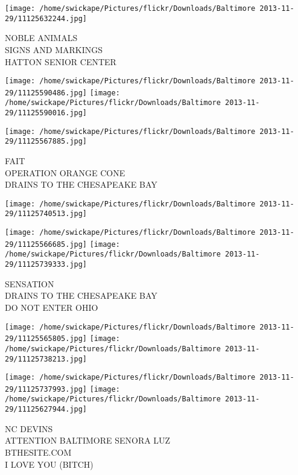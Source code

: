 \documentclass[10pt,letterpaper]{article}
\begin{document}
\vspace{0.25in}
\texttt{[image: /home/swickape/Pictures/flickr/Downloads/Baltimore 2013-11-29/11125632244.jpg]}

NOBLE ANIMALS\\
SIGNS AND MARKINGS\\
HATTON SENIOR CENTER\\
\pagebreak

\texttt{[image: /home/swickape/Pictures/flickr/Downloads/Baltimore 2013-11-29/11125590486.jpg]}
\texttt{[image: /home/swickape/Pictures/flickr/Downloads/Baltimore 2013-11-29/11125590016.jpg]}

\texttt{[image: /home/swickape/Pictures/flickr/Downloads/Baltimore 2013-11-29/11125567885.jpg]}

FAIT\\
OPERATION ORANGE CONE\\
DRAINS TO THE CHESAPEAKE BAY\\
\pagebreak

\texttt{[image: /home/swickape/Pictures/flickr/Downloads/Baltimore 2013-11-29/11125740513.jpg]}

\vspace{0.25in}
\texttt{[image: /home/swickape/Pictures/flickr/Downloads/Baltimore 2013-11-29/11125566685.jpg]}
\texttt{[image: /home/swickape/Pictures/flickr/Downloads/Baltimore 2013-11-29/11125739333.jpg]}

SENSATION\\
DRAINS TO THE CHESAPEAKE BAY\\
DO NOT ENTER OHIO\\
\pagebreak

\texttt{[image: /home/swickape/Pictures/flickr/Downloads/Baltimore 2013-11-29/11125565805.jpg]}
\texttt{[image: /home/swickape/Pictures/flickr/Downloads/Baltimore 2013-11-29/11125738213.jpg]}

\texttt{[image: /home/swickape/Pictures/flickr/Downloads/Baltimore 2013-11-29/11125737993.jpg]}
\texttt{[image: /home/swickape/Pictures/flickr/Downloads/Baltimore 2013-11-29/11125627944.jpg]}

NC DEVINS\\
ATTENTION BALTIMORE SENORA LUZ\\
BTHESITE.COM\\
I LOVE YOU (BITCH)\\
\pagebreak
\end{document}
